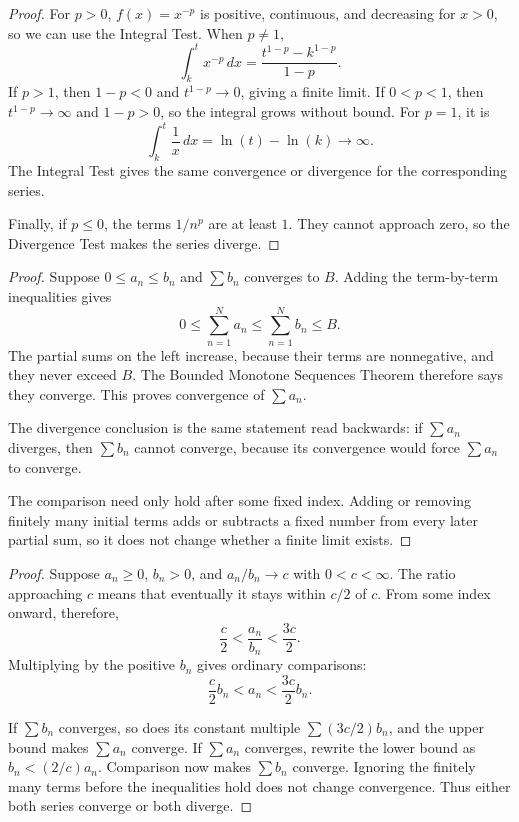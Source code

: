 \begin{proof}
For $p>0$, $f(x)=x^{-p}$ is positive, continuous, and decreasing for
$x>0$, so we can use the Integral Test. When $p\ne1$,
$$\int_k^t x^{-p}\,dx=\frac{t^{1-p}-k^{1-p}}{1-p}.$$
If $p>1$, then $1-p<0$ and $t^{1-p}\to0$, giving a finite limit. If
$0<p<1$, then $t^{1-p}\to\infty$ and $1-p>0$, so the integral grows
without bound. For $p=1$, it is
$$\int_k^t\frac1x\,dx=\ln(t)-\ln(k)\longrightarrow\infty.$$
The Integral Test gives the same convergence or divergence for the
corresponding series.

Finally, if $p\leq0$, the terms $1/n^p$ are at least $1$. They cannot
approach zero, so the Divergence Test makes the series diverge.
\end{proof}


\begin{proof}
Suppose $0\leq a_n\leq b_n$ and $\sum b_n$ converges to $B$.
Adding the term-by-term inequalities gives
$$0\leq\sum_{n=1}^N a_n\leq\sum_{n=1}^N b_n\leq B.$$
The partial sums on the left increase, because their terms are
nonnegative, and they never exceed $B$. The Bounded Monotone Sequences
Theorem therefore says they converge. This proves convergence of
$\sum a_n$.

The divergence conclusion is the same statement read backwards:
if $\sum a_n$ diverges, then $\sum b_n$ cannot converge, because its
convergence would force $\sum a_n$ to converge.

The comparison need only hold after some fixed index. Adding or removing
finitely many initial terms adds or subtracts a fixed number from every
later partial sum, so it does not change whether a finite limit exists.
\end{proof}


\begin{proof}
Suppose $a_n\geq0$, $b_n>0$, and $a_n/b_n\to c$ with
$0<c<\infty$. The ratio approaching $c$ means that eventually it stays
within $c/2$ of $c$. From some index onward, therefore,
$$\frac c2<\frac{a_n}{b_n}<\frac{3c}{2}.$$
Multiplying by the positive $b_n$ gives ordinary comparisons:
$$\frac c2 b_n<a_n<\frac{3c}{2}b_n.$$

If $\sum b_n$ converges, so does its constant multiple
$\sum (3c/2)b_n$, and the upper bound makes $\sum a_n$ converge.
If $\sum a_n$ converges, rewrite the lower bound as
$b_n<(2/c)a_n$. Comparison now makes $\sum b_n$ converge.
Ignoring the finitely many terms before the inequalities hold does not
change convergence. Thus either both series converge or both diverge.
\end{proof}

